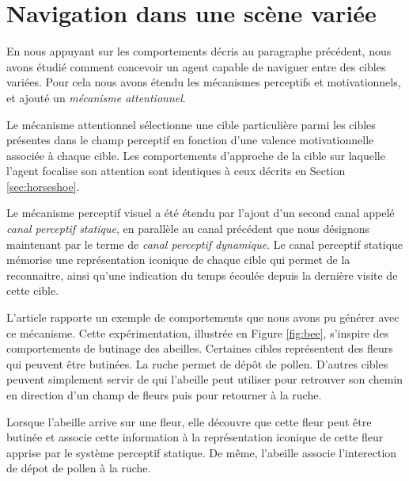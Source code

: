 \section{Navigation dans une scène variée}

\noindent
En nous appuyant sur les comportements décris au paragraphe précédent, nous avons étudié comment concevoir un agent capable de naviguer entre des cibles variées. 
Pour cela nous avons étendu les mécanismes perceptifs et motivationnels, et ajouté un \emph{mécanisme attentionnel}.

Le mécanisme attentionnel sélectionne une cible particulière parmi les cibles présentes dans le champ perceptif en fonction d'une valence motivationnelle associée à chaque cible.
Les comportements d'approche de la cible sur laquelle l'agent focalise son attention sont identiques à ceux décrits en Section \ref{sec:horseshoe}.

Le mécanisme perceptif visuel a été étendu par l'ajout d'un second canal appelé \emph{canal perceptif statique}, en parallèle au canal précédent que nous désignons maintenant par le terme de \emph{canal perceptif dynamique}.
Le canal perceptif statique mémorise une représentation iconique de chaque cible qui permet de la reconnaitre, ainsi qu'une indication du temps écoulée depuis la dernière visite de cette cible. 

L'article  \cite{georgeon_early-stage_2011} rapporte un exemple de comportements que nous avons pu générer avec ce mécanisme.
Cette expérimentation, illustrée en Figure \ref{fig:bee}, s'inspire des comportements de butinage des abeilles. 
Certaines cibles représentent des fleurs qui peuvent être butinées. 
La ruche permet de dépôt de pollen.
D'autres cibles peuvent simplement servir de  qui l'abeille peut utiliser pour retrouver son chemin en direction d'un champ de fleurs puis pour retourner à la ruche.   

Lorsque l'abeille arrive sur une fleur, elle découvre que cette fleur peut être butinée et associe cette information à la représentation iconique de cette fleur apprise par le système perceptif statique. 
De même, l'abeille associe l'interection de \og dépot de pollen \fg à la ruche. 

